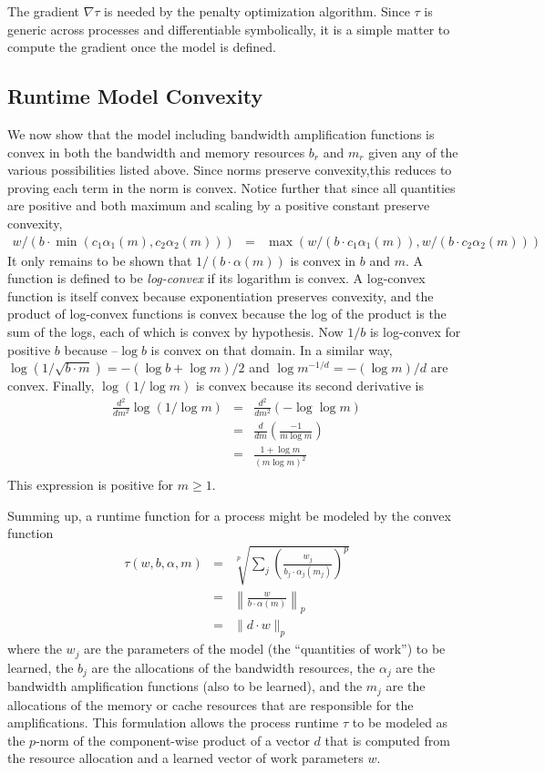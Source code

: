 The gradient $\nabla\tau$ is needed by the penalty optimization algorithm.
Since $\tau$ is generic across processes and differentiable symbolically,
it is a simple matter to compute the gradient once the model is defined.

\subsection*{Runtime Model Convexity}

We now show that the model including bandwidth amplification functions is convex
in both the bandwidth and memory resources $b_r$ and $m_r$ given any of the various possibilities listed above.
Since norms preserve convexity,this reduces to proving each term in the norm is convex.
Notice further that since all quantities are positive and both maximum and scaling by a positive constant preserve convexity,
\begin{eqnarray*}
w/(b\cdot\min(c_1\alpha_1(m),c_2\alpha_2(m))) &=& \max(w/(b\cdot c_1\alpha_1(m)),w/(b\cdot c_2\alpha_2(m)))
\end{eqnarray*}
It only remains to be shown that $1/(b\cdot\alpha(m))$ is convex in $b$ and $m$.
A function is defined to be \emph{log-convex} if its logarithm is convex.
A log-convex function is itself convex because exponentiation preserves convexity,
and the product of log-convex functions is convex because the log of the product is the sum of the logs,
each of which is convex by hypothesis.
Now $1/b$ is log-convex for positive $b$ because $– \log b$ is convex on that domain.
In a similar way, $\log(1/\sqrt{b\cdot m}) = -(\log b + \log m)/2$
and $\log m^{-1/d} = -(\log m)/d$ are convex.
Finally, $\log (1/\log m)$ is convex because its second derivative is
\begin{eqnarray*}
\frac{d^2}{dm^2}\log (1/\log m) &=& \frac{d^2}{dm^2}(-\log\log m)  \\
                                  &=& \frac{d}{dm}\left(\frac{-1}{m\log m}\right) \\
                                  &=& \frac{1 + \log m}{(m\log m)^2}   \\
\end{eqnarray*}
This expression is positive for $m \geq 1$.

Summing up, a runtime function for a process might be modeled by the convex function
\begin{eqnarray*}
\tau(w,b,\alpha,m) &=& \sqrt[p]{\sum_j \left(\frac{w_j}{b_j\cdot\alpha_j(m_j)}\right)^p}  \\
                   &=& \left\|\frac{w}{b \cdot \alpha(m)}\right\|_p \\
                   &=& \|d \cdot w \|_p
\end{eqnarray*}
where the $w_j$ are the parameters of the model (the “quantities of work”) to be learned,
the $b_j$  are the allocations of the bandwidth resources,
the $\alpha_j$ are the bandwidth amplification functions (also to be learned),
and the $m_j$ are the allocations of the memory or cache resources that are responsible for the amplifications.
This formulation allows the process runtime $\tau$ to be modeled as the $p$-norm of
the component-wise product of a vector $d$ that is computed from the resource allocation
and a learned vector of work parameters $w$.
